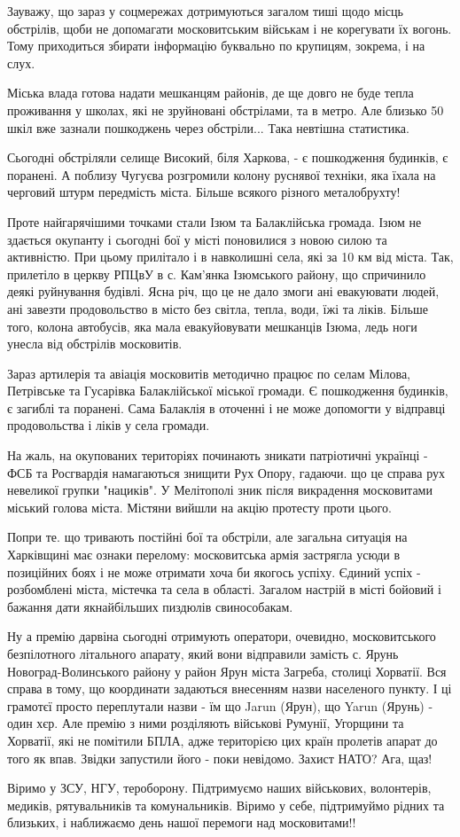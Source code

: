 Зауважу, що зараз у соцмережах дотримуються загалом тиші щодо місць обстрілів,
щоби не допомагати московитським військам і не корегувати їх вогонь. Тому
приходиться збирати інформацію буквально по крупицям, зокрема, і на слух.

Міська влада готова надати мешканцям районів, де ще довго не буде тепла
проживання у школах, які не зруйновані обстрілами, та в метро. Але близько 50
шкіл вже зазнали пошкоджень через обстріли... Така невтішна статистика.

Сьогодні обстріляли селище Високий, біля Харкова, - є пошкодження будинків, є
поранені. А поблизу Чугуєва розгромили колону руснявої техніки, яка їхала на
черговий штурм передмість міста. Більше всякого різного металобрухту!

Проте найгарячішими точками стали Ізюм та Балаклійська громада. Ізюм не
здається окупанту і сьогодні бої у місті поновилися з новою силою та
активністю. При цьому прилітало і в навколишні села, які за 10 км від міста.
Так, прилетіло в церкву РПЦвУ в с. Кам'янка Ізюмського району, що спричинило
деякі руйнування будівлі. Ясна річ, що це не дало змоги ані евакуювати людей,
ані завезти продовольство в місто без світла, тепла, води, їжі та ліків. Більше
того, колона автобусів, яка мала евакуйовувати мешканців Ізюма, ледь ноги
унесла від обстрілів московитів.

Зараз артилерія та авіація московитів методично працює по селам Мілова,
Петрівське та Гусарівка Балаклійської міської громади. Є пошкодження будинків,
є загиблі та поранені. Сама Балаклія в оточенні і не може допомогти у відправці
продовольства і ліків у села громади.

На жаль, на окупованих територіях починають зникати патріотичні українці - ФСБ
та Росгвардія намагаються знищити Рух Опору, гадаючи. що це справа рух
невеликої групки "нациків". У Мелітополі зник після викрадення московитами
міський голова міста. Містяни вийшли на акцію протесту проти цього.

Попри те. що тривають постійні бої та обстріли, але загальна ситуація на
Харківщині має ознаки перелому: московитська армія застрягла усюди в позиційних
боях і не може отримати хоча би якогось успіху. Єдиний успіх - розбомблені
міста, містечка та села в області. Загалом настрій в місті бойовий і бажання
дати якнайбільших пиздюлів свинособакам.

Ну а премію дарвіна сьогодні отримують оператори, очевидно, московитського
безпілотного літального апарату, який вони відправили замість с. Ярунь
Новоград-Волинського району у район Ярун міста Загреба, столиці Хорватії. Вся
справа в тому, що координати задаються внесенням назви населеного пункту. І ці
грамотєї просто переплутали назви - їм що Jarun (Ярун), що Yarun (Ярунь) - один
хєр. Але премію з ними розділяють військові Румунії, Угорщини та Хорватії, які
не помітили БПЛА, адже територією цих країн пролетів апарат до того як впав.
Звідки запустили його - поки невідомо. Захист НАТО? Ага, щаз!

Віримо у ЗСУ, НГУ, тероборону. Підтримуємо наших військових, волонтерів,
медиків, рятувальників та комунальників. Віримо у себе, підтримуймо рідних та
близьких, і наближаємо день нашої перемоги над московитами!!

